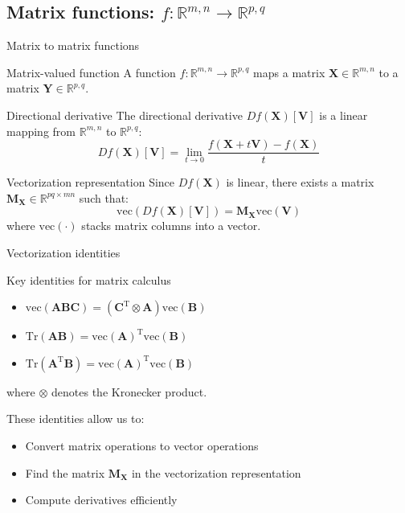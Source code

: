 \documentclass[aspectratio=1610]{beamer}
\begin{document}
\subsection{Matrix functions: $f:\mathbb{R}^{m,n} \to \mathbb{R}^{p,q}$}

\begin{frame}{Matrix to matrix functions}
  \begin{block}{Matrix-valued function}
    A function $f:\mathbb{R}^{m,n} \to \mathbb{R}^{p,q}$ maps a matrix $\mathbf{X} \in \mathbb{R}^{m,n}$ to a matrix $\mathbf{Y} \in \mathbb{R}^{p,q}$.
  \end{block}
  
  \begin{block}{Directional derivative}
    The directional derivative $Df(\mathbf{X})[\mathbf{V}]$ is a linear mapping from $\mathbb{R}^{m,n}$ to $\mathbb{R}^{p,q}$:
    $$Df(\mathbf{X})[\mathbf{V}] = \lim_{t \to 0} \frac{f(\mathbf{X} + t\mathbf{V}) - f(\mathbf{X})}{t}$$
  \end{block}
  
  \begin{block}{Vectorization representation}
    Since $Df(\mathbf{X})$ is linear, there exists a matrix $\mathbf{M}_{\mathbf{X}} \in \mathbb{R}^{pq \times mn}$ such that:
    $$\mathrm{vec}(Df(\mathbf{X})[\mathbf{V}]) = \mathbf{M}_{\mathbf{X}} \mathrm{vec}(\mathbf{V})$$
    where $\mathrm{vec}(\cdot)$ stacks matrix columns into a vector.
  \end{block}
\end{frame}

\begin{frame}{Vectorization identities}
  \begin{block}{Key identities for matrix calculus}
    \begin{itemize}
      \item $\mathrm{vec}(\mathbf{A}\mathbf{B}\mathbf{C}) = (\mathbf{C}^\mathrm{T} \otimes \mathbf{A}) \mathrm{vec}(\mathbf{B})$
      \item $\mathrm{Tr}(\mathbf{A}\mathbf{B}) = \mathrm{vec}(\mathbf{A})^\mathrm{T}\mathrm{vec}(\mathbf{B})$
      \item $\mathrm{Tr}(\mathbf{A}^\mathrm{T}\mathbf{B}) = \mathrm{vec}(\mathbf{A})^\mathrm{T}\mathrm{vec}(\mathbf{B})$
    \end{itemize}
  \end{block}
  
  where $\otimes$ denotes the Kronecker product.
  
  \vspace{10pt}
  
  These identities allow us to:
  \begin{itemize}
    \item Convert matrix operations to vector operations
    \item Find the matrix $\mathbf{M}_{\mathbf{X}}$ in the vectorization representation
    \item Compute derivatives efficiently
  \end{itemize}
\end{frame}
\end{document}
